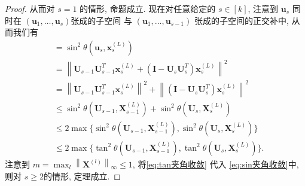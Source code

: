 \begin{proof}
  从而对 $s = 1$ 的情形, 命题成立. 现在对任意给定的 $s \in [k]$, 注意到 $\mathbf{u}_s$ 同时在 $(\mathbf{u}_1, \dots, \mathbf{u}_s)$张成的子空间 与 $(\mathbf{u}_1, \dots, \mathbf{u}_{s-1})$ 张成的子空间的正交补中, 从而我们有
  \begin{equation}\label{eq:sin夹角收敛}
  	\begin{split} &= \sin^2\theta\left(\mathbf{u}_s, \mathbf{x}_s^{(L)}\right) \\
  		&= \left\|\mathbf{U}_{s-1} \mathbf{U}_{s-1}^T \mathbf{x}_s^{(L)} + \left(\mathbf{I} - \mathbf{U}_s \mathbf{U}_s^T\right) \mathbf{x}_s^{(L)}\right\|^2 \\
  		&= \left\|\mathbf{U}_{s-1} \mathbf{U}_{s-1}^T \mathbf{x}_s^{(L)} \right\|^2 + \left\|(\mathbf{I} - \mathbf{U}_s \mathbf{U}_s^T) \mathbf{x}_s^{(L)}\right\|^2 \\
  		&\le \sin^2\theta \left(\mathbf{U}_{s-1}, \mathbf{X}_{s-1}^{(L)}\right) + \sin^2\theta \left(\mathbf{U}_{s}, \mathbf{X}_{s}^{(L)}\right) \\
  		&\le 2 \max\biggl\{\sin^2\theta \left(\mathbf{U}_{s-1}, \mathbf{X}_{s-1}^{(L)}\right), \sin^2\theta \left(\mathbf{U}_{s}, \mathbf{X}_{s}^{(L)}\right)\biggr\} \\
  		&\le 2 \max\biggl\{\tan^2\theta \left(\mathbf{U}_{s-1}, \mathbf{X}_{s-1}^{(L)}\right), \tan^2\theta \left(\mathbf{U}_{s}, \mathbf{X}_{s}^{(L)}\right)\biggr\}.
  	\end{split}
  \end{equation}
  注意到 $m = \max_l \left\|\mathbf{X}^{(l)}\right\|_\infty\le 1$, 将\eqref{eq:tan夹角收敛} 代入 \eqref{eq:sin夹角收敛}中, 则对 $s\ge 2$的情形, 定理成立.
\end{proof}


